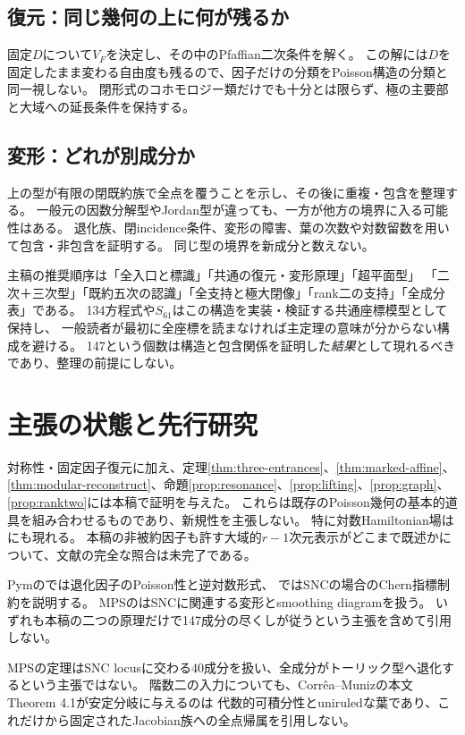 \documentclass[a4paper,11pt]{ltjsarticle}
\theoremstyle{definition}
\theoremstyle{definition}\newtheorem{definition}[theorem]{定義}
\theoremstyle{remark}\newtheorem{remark}[theorem]{注意}
\begin{document}
\subsection{復元：同じ幾何の上に何が残るか}
固定$D$について$V_F$を決定し、その中のPfaffian二次条件を解く。
この解には$D$を固定したまま変わる自由度も残るので、因子だけの分類をPoisson構造の分類と同一視しない。
閉形式のコホモロジー類だけでも十分とは限らず、極の主要部と大域への延長条件を保持する。

\subsection{変形：どれが別成分か}
上の型が有限の閉既約族で全点を覆うことを示し、その後に重複・包含を整理する。
一般元の因数分解型やJordan型が違っても、一方が他方の境界に入る可能性はある。
退化族、閉incidence条件、変形の障害、葉の次数や対数留数を用いて包含・非包含を証明する。
同じ型の境界を新成分と数えない。

主稿の推奨順序は「全入口と標識」「共通の復元・変形原理」「超平面型」
「二次＋三次型」「既約五次の認識」「全支持と極大閉像」「rank二の支持」「全成分表」である。
134方程式や$S_{61}$はこの構造を実装・検証する共通座標模型として保持し、
一般読者が最初に全座標を読まなければ主定理の意味が分からない構成を避ける。
147という個数は構造と包含関係を証明した\emph{結果}として現れるべきであり、整理の前提にしない。

\section{主張の状態と先行研究}
対称性・固定因子復元に加え、定理\ref{thm:three-entrances}、\ref{thm:marked-affine}、
\ref{thm:modular-reconstruct}、命題\ref{prop:resonance}、\ref{prop:lifting}、\ref{prop:graph}、\ref{prop:ranktwo}には本稿で証明を与えた。
これらは既存のPoisson幾何の基本的道具を組み合わせるものであり、新規性を主張しない。
特に対数Hamiltonian場は\cite[Example 4.14]{MPS}にも現れる。
本稿の非被約因子も許す大域的$r-1$次元表示がどこまで既述かについて、文献の完全な照合は未完了である。

Pymの\cite[\S5.1]{Pym}では退化因子のPoisson性と逆対数形式、
\cite[Propositions 5.14, 5.16]{Pym}ではSNCの場合のChern指標制約を説明する。
MPSの\cite[\S3.1, Theorem 1.4]{MPS}はSNCに関連する変形とsmoothing diagramを扱う。
いずれも本稿の二つの原理だけで147成分の尽くしが従うという主張を含めて引用しない。

MPSの定理はSNC locusに交わる40成分を扱い、全成分がトーリック型へ退化するという主張ではない。
階数二の入力についても、Corr\^ea--Munizの本文Theorem 4.1\cite{CM}が安定分岐に与えるのは
代数的可積分性とuniruledな葉であり、これだけから固定されたJacobian族への全点帰属を引用しない。
\end{document}
